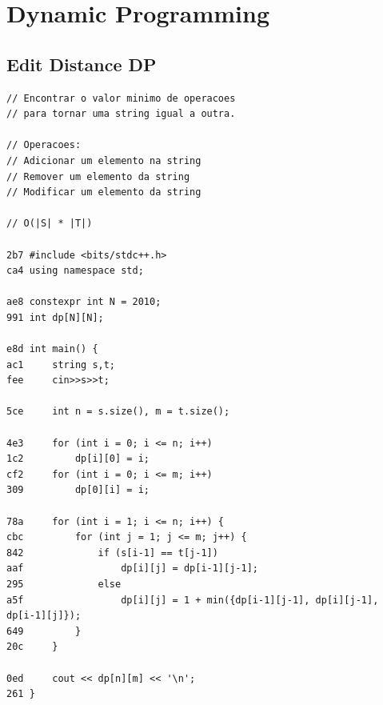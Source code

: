 \documentclass[11pt, a4paper, twoside]{article}
\begin{document}
%
%

\section{Dynamic Programming}

\subsection{Edit Distance DP}
\begin{lstlisting}
// Encontrar o valor minimo de operacoes 
// para tornar uma string igual a outra.

// Operacoes:
// Adicionar um elemento na string
// Remover um elemento da string
// Modificar um elemento da string

// O(|S| * |T|)

2b7 #include <bits/stdc++.h>
ca4 using namespace std;

ae8 constexpr int N = 2010;
991 int dp[N][N];

e8d int main() {
ac1     string s,t;
fee     cin>>s>>t;
        
5ce     int n = s.size(), m = t.size();
    
4e3     for (int i = 0; i <= n; i++)
1c2         dp[i][0] = i;
cf2     for (int i = 0; i <= m; i++)
309         dp[0][i] = i;
        
78a     for (int i = 1; i <= n; i++) {
cbc         for (int j = 1; j <= m; j++) {
842             if (s[i-1] == t[j-1])
aaf                 dp[i][j] = dp[i-1][j-1];
295             else
a5f                 dp[i][j] = 1 + min({dp[i-1][j-1], dp[i][j-1], dp[i-1][j]});
649         }
20c     }
    
0ed     cout << dp[n][m] << '\n';
261 }
\end{lstlisting}
\end{document}
